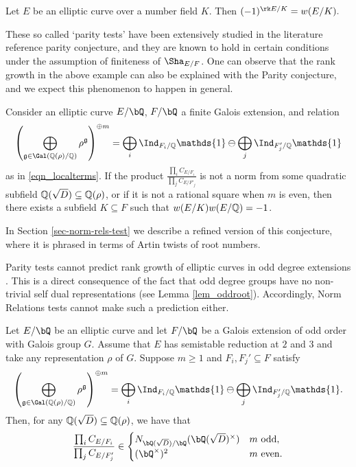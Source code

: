 \begin{conj}\label{conj_parity}
    Let $E$ be an elliptic curve over a number field $K$. Then
    $(-1)^{\rk E / K} = w(E / K).$
\end{conj}

These so called `parity tests' have been extensively studied in the literature {\color{red} reference parity conjecture}, and they are known to hold in certain conditions under the assumption of finiteness of $\Sha_{E/F}$. One can observe that the rank growth in the above example can also be explained with the Parity conjecture, and we expect this phenomenon to happen in general. 

\begin{conj}\label{conj_normroot}
    Consider an elliptic curve $E / \bQ$, $F / \bQ$ a finite Galois extension, and relation 
    $$\left(\bigoplus_{\mathfrak{g}\in\Gal(\QQ(\rho)/\QQ)}\rho^{\mathfrak{g}}\right)^{\oplus m}=\bigoplus_i\Ind_{F_i/\QQ}\mathds{1}\ominus\bigoplus_j\Ind_{F'_j/\QQ}\mathds{1}$$
    as in \eqref{eqn_localterms}. If the product $\frac{\prod_i C_{E/F_i}}{\prod_j C_{E/F'_j}}$ is not a norm from some quadratic subfield $\mathbb{Q}(\sqrt{D})\subseteq\mathbb{Q}(\rho)$, or if it is not a rational square when $m$ is even, then there exists a subfield $K\subseteq F$ such that $w(E/K)w(E/\mathbb{Q})=-1$. 
\end{conj}

In Section \ref{sec-norm-rels-test} we describe a refined version of this conjecture, where it is phrased in terms of Artin twists of root numbers.

Parity tests cannot predict rank growth of elliptic curves in odd degree extensions . This is a direct consequence of the fact that odd degree groups have no non-trivial self dual representations (see Lemma \ref{lem_oddroot}). Accordingly, Norm Relations tests cannot make such a prediction either.

\begin{thm}\label{thm_odd-cons}
    Let $E / \bQ$ be an elliptic curve and let $F / \bQ$ be a Galois extension of odd order with Galois group $G$. Assume that $E$ has semistable reduction at $2$ and $3$ and take any representation $\rho$ of $G$. Suppose $m\geq 1$ and $F_i,F_j'\subseteq F$ satisfy 
    \begin{equation*}%
        \left(\bigoplus_{\mathfrak{g}\in\Gal(\QQ(\rho)/\QQ)}\rho^{\mathfrak{g}}\right)^{\oplus m }=\bigoplus_i\Ind_{F_i/\QQ}\mathds{1}\ominus\bigoplus_j\Ind_{F'_j/\QQ}\mathds{1}.
    \end{equation*}
    Then, for any $\mathbb{Q}(\sqrt{D})\subseteq\mathbb{Q}(\rho)$, we have that
    \[ \frac{\prod_i C_{E/F_i}}{\prod_j C_{E/F_j'}}  \in 
       \begin{cases}
           N_{\bQ(\sqrt{D}) / \bQ}(\bQ(\sqrt{D})^{\times}) & m \ \text{odd}, \\
           (\bQ^{\times})^2 & m \ \text{even}.
       \end{cases} 
    \] 
\end{thm}

